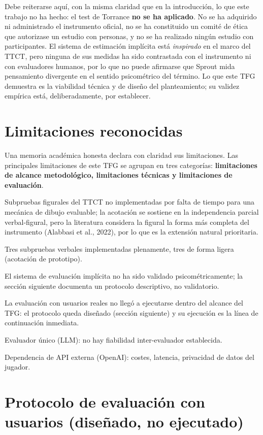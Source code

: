 \documentclass[12pt,twoside,titlepage]{report}
\begin{document}
Debe reiterarse aquí, con la misma claridad que en la introducción, lo que este trabajo no ha hecho: el test de Torrance \textbf{no se ha aplicado}. No se ha adquirido ni administrado el instrumento oficial, no se ha constituido un comité de ética que autorizase un estudio con personas, y no se ha realizado ningún estudio con participantes. El sistema de estimación implícita está \textit{inspirado} en el marco del TTCT, pero ninguna de sus medidas ha sido contrastada con el instrumento ni con evaluadores humanos, por lo que no puede afirmarse que Sprout mida pensamiento divergente en el sentido psicométrico del término. Lo que este TFG demuestra es la viabilidad técnica y de diseño del planteamiento; su validez empírica está, deliberadamente, por establecer.

\section{Limitaciones reconocidas}

Una memoria académica honesta declara con claridad sus limitaciones. Las principales limitaciones de este TFG se agrupan en tres categorías: \textbf{limitaciones de alcance metodológico, limitaciones técnicas y limitaciones de evaluación}.

Subpruebas figurales del TTCT no implementadas por falta de tiempo para una mecánica de dibujo evaluable; la acotación se sostiene en la independencia parcial verbal-figural, pero la literatura considera la figural la forma más completa del instrumento (Alabbasi et al., 2022), por lo que es la extensión natural prioritaria.

Tres subpruebas verbales implementadas plenamente, tres de forma ligera (acotación de prototipo).

El sistema de evaluación implícita no ha sido validado psicométricamente; la sección siguiente documenta un protocolo descriptivo, no validatorio.

La evaluación con usuarios reales no llegó a ejecutarse dentro del alcance del TFG: el protocolo queda diseñado (sección siguiente) y su ejecución es la línea de continuación inmediata.

Evaluador único (LLM): no hay fiabilidad inter-evaluador establecida.

Dependencia de API externa (OpenAI): costes, latencia, privacidad de datos del jugador.

\section{Protocolo de evaluación con usuarios (diseñado, no ejecutado)}
\end{document}
